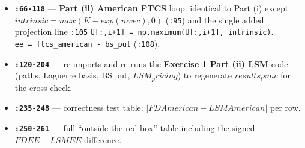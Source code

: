 \documentclass[
  11pt,
]{article}
\providecommand{\tightlist}{%
  \setlength{\itemsep}{0pt}\setlength{\parskip}{0pt}}
\begin{document}
\begin{itemize}
  \begin{itemize}
  \tightlist
  \item
    \texttt{:24-26} closed-form BS put for reference.
  \item
    \texttt{:29} domain length \(L = 2*log(K) + 2\); \texttt{:30}
    \(Nx = 1000\); \texttt{:31} \(Nt = 40000*T\); \texttt{:32-33} steps
    \texttt{h\ =\ L/Nx}, \texttt{k\ =\ T/Nt}.
  \item
    \texttt{:35-36} central-difference matrices: \(T1\) (first
    derivative, \texttt{+1/-1} off-diagonals), \(T2\) (second
    derivative, \(-2\) on diagonal, \(1\) off-diagonals), size
    \((Nx-1)\).
  \item
    \texttt{:38-40} explicit evolution matrix
    \texttt{F\ =\ (1\ -\ r\ k)\ I\ +\ 0.5\ k\ sigma\^{}2\ /\ h\^{}2\ *\ T2\ +\ k\ (r\ -\ 0.5\ sigma\^{}2)/(2h)\ *\ T1}.
  \item
    \texttt{:42-43} grid \(mvec\), centered and shifted by \(+log(K)\).
  \item
    \texttt{:45-46} initial condition \(U[:,0] = max(K - exp(mvec), 0)\)
    (payoff as the time-0 condition in time-to-maturity).
  \item
    \texttt{:48-52} forward march; \texttt{:51} boundary correction term
    \(p[0]\) injected at the low-\(m\) (deep ITM) boundary node, scaled
    by \(K*exp(-r*time2mat)\).
  \item
    \texttt{:54} \texttt{np.interp} to read off the price at
    \(log(S0)\).
  \end{itemize}
\item
  \textbf{\texttt{:66-118}} --- \textbf{Part (ii) American FTCS} loop:
  identical to Part (i) except \(intrinsic = max(K - exp(mvec), 0)\)
  (\texttt{:95}) and the single added projection line \texttt{:105}
  \texttt{U{[}:,i+1{]}\ =\ np.maximum(U{[}:,i+1{]},\ intrinsic)}.
  \texttt{ee\ =\ ftcs\_american\ -\ bs\_put} (\texttt{:108}).
\item
  \textbf{\texttt{:120-204}} --- re-imports and re-runs the
  \textbf{Exercise 1 Part (ii) LSM} code (paths, Laguerre basis, BS put,
  \(LSM_pricing\)) to regenerate \(results_lsmc\) for the cross-check.
\item
  \textbf{\texttt{:235-248}} --- correctness test table:
  \(|FD American - LSM American|\) per row.
\item
  \textbf{\texttt{:250-261}} --- full ``outside the red box'' table
  including the signed \(FD EE - LSM EE\) difference.
\end{itemize}
\end{document}
